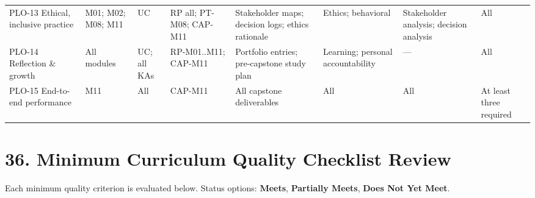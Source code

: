 \documentclass[11pt,letterpaper,oneside]{report}
\begin{document}
\begin{landscape}
\begin{longtable}{@{}R{2.40cm} R{2.50cm} R{1.85cm} R{2.30cm} R{3.05cm} R{2.30cm} R{3.10cm} R{2.40cm}@{}}
PLO-13 Ethical, inclusive practice
  & M01; M02; M08; M11
  & UC
  & RP all; PT-M08; CAP-M11
  & Stakeholder maps; decision logs; ethics rationale
  & Ethics; behavioral
  & Stakeholder analysis; decision analysis
  & All \\

PLO-14 Reflection \& growth
  & All modules
  & UC; all KAs
  & RP-M01..M11; CAP-M11
  & Portfolio entries; pre-capstone study plan
  & Learning; personal accountability
  & ---
  & All \\

PLO-15 End-to-end performance
  & M11
  & All
  & CAP-M11
  & All capstone deliverables
  & All
  & All
  & At least three required \\

\end{longtable}
\end{landscape}


\section*{36. Minimum Curriculum Quality Checklist Review}
Each minimum quality criterion is evaluated below. Status options: \textbf{Meets}, \textbf{Partially Meets}, \textbf{Does Not Yet Meet}.
\end{document}
